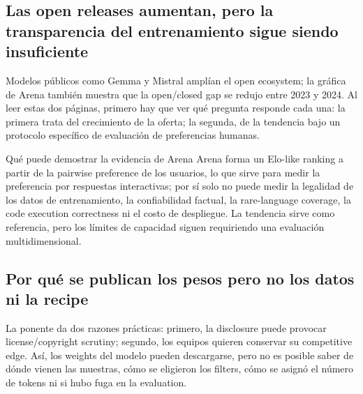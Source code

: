 \subsection{Las open releases aumentan, pero la transparencia del entrenamiento sigue siendo insuficiente}

Modelos públicos como Gemma y Mistral amplían el open ecosystem; la gráfica de Arena también muestra que la open/closed gap se redujo entre 2023 y 2024. Al leer estas dos páginas, primero hay que ver qué pregunta responde cada una: la primera trata del crecimiento de la oferta; la segunda, de la tendencia bajo un protocolo específico de evaluación de preferencias humanas.



\begin{knowledgebox}{Qué puede demostrar la evidencia de Arena}
Arena forma un Elo-like ranking a partir de la pairwise preference de los usuarios, lo que sirve para medir la preferencia por respuestas interactivas; por sí solo no puede medir la legalidad de los datos de entrenamiento, la confiabilidad factual, la rare-language coverage, la code execution correctness ni el costo de despliegue. La tendencia sirve como referencia, pero los límites de capacidad siguen requiriendo una evaluación multidimensional.
\end{knowledgebox}

\subsection{Por qué se publican los pesos pero no los datos ni la recipe}

La ponente da dos razones prácticas: primero, la disclosure puede provocar license/copyright scrutiny; segundo, los equipos quieren conservar su competitive edge. Así, los weights del modelo pueden descargarse, pero no es posible saber de dónde vienen las muestras, cómo se eligieron los filters, cómo se asignó el número de tokens ni si hubo fuga en la evaluation.



